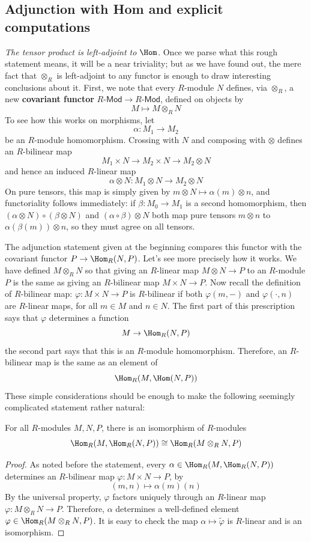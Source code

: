 \subsection{Adjunction with Hom and explicit computations}
\textit{The tensor product is left-adjoint to $\Hom$}. Once we parse what this rough statement means, it will be a near triviality; but as we have found out, the mere fact that $\otimes_R$ is
left-adjoint to any functor is enough to draw interesting conclusions about it.
First, we note that every $R$-module $N$ defines, via $\otimes_R$, a new \textbf{covariant functor} $R$-$\mathsf{Mod}\to R$-$\mathsf{Mod}$, defined on objects by
\[M\mapsto M\otimes_{R}N\]
To see how this works on morphisms, let
\[\alpha:M_1\to M_2\]
be an $R$-module homomorphism. Crossing with $N$ and composing with $\otimes$ defines an $R$-bilinear map
\[M_1\times N\to M_2\times N\to M_2\otimes N\]
and hence an induced $R$-linear map
\[\alpha\otimes N:M_1\otimes N\to M_2\otimes N\]
On pure tensors, this map is simply given by $m\otimes N\mapsto\alpha(m)\otimes n$, and functoriality follows immediately: if $\beta:M_0\to M_1$ is a second homomorphism, then $(\alpha\otimes N)\circ(\beta\otimes N)$ and $(\alpha\circ\beta)\otimes N$ both map pure tensors $m\otimes n$ to $\alpha(\beta(m))\otimes n$, so they must agree on all tensors.\par
The adjunction statement given at the beginning compares this functor with the covariant functor $P\to\Hom_{R}(N,P)$. Let's see more precisely how it works. We have defined $M\otimes_{R}N$ so that giving an $R$-linear map $M\otimes N\to P$ to an $R$-module $P$ is the same as giving an $R$-bilinear map $M\times N\to P$. Now recall the definition of $R$-bilinear map: $\varphi:M\times N\to P$ is $R$-bilinear if both $\varphi(m,-)$ and $\varphi(\cdot,n)$ are $R$-linear maps, for all $m\in M$ and $n\in N$. The first part of this prescription says that $\varphi$ determines a function
\[M\to\Hom_{R}(N,P)\]
the second part says that this is an $R$-module homomorphism. Therefore, an $R$-bilinear map is the same as an element of
\[\Hom_R(M,\Hom(N,P))\]
These simple considerations should be enough to make the following seemingly
complicated statement rather natural:
\begin{lemma}\label{tensor hom iso}
For all $R$-modules $M,N,P$, there is an isomorphism of $R$-modules
\[\Hom_R(M,\Hom_R(N,P))\cong\Hom_R(M\otimes_{R}N,P)\]
\end{lemma}
\begin{proof}
As noted before the statement, every $\alpha\in\Hom_R(M,\Hom_R(N,P))$ determines an $R$-bilinear map $\varphi:M\times N\to P$, by
\[(m,n)\mapsto\alpha(m)(n)\]
By the universal property, $\varphi$ factors uniquely through an $R$-linear map $\varphi:M\otimes_{R}N\to P$. Therefore, $\alpha$ determines a well-defined element $\varphi\in\Hom_R(M\otimes_{R}N,P)$. It is easy to check the map $\alpha\mapsto\widetilde{\varphi}$ is $R$-linear and is an isomorphism.
\end{proof}
